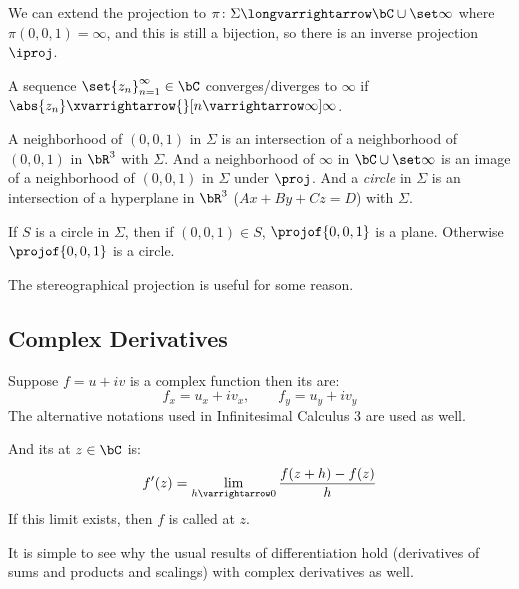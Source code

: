 \documentclass[10pt]{article}
\begin{document}
We can extend the projection to $\pi\colon\Sigma\longvarrightarrow\bC\cup\set\infty$ where $\pi(0,0,1)=\infty$, and this is still a bijection, so there is an inverse projection $\iproj$.

\newpage
\begin{defn*}

    A sequence $\set{z_n}_{n=1}^\infty\in\bC$ converges/diverges to $\infty$ if $\abs{z_n}\xvarrightarrow{}[n\varrightarrow\infty]\infty$.

\end{defn*}

A neighborhood of $(0,0,1)$ in $\Sigma$ is an intersection of a neighborhood of $(0,0,1)$ in $\bR^3$ with $\Sigma$.
And a neighborhood of $\infty$ in $\bC\cup\set\infty$ is an image of a neighborhood of $(0,0,1)$ in $\Sigma$ under $\proj$.
And a \emph{circle} in $\Sigma$ is an intersection of a hyperplane in $\bR^3$ ($Ax+By+Cz=D$) with $\Sigma$.

\begin{prop*}

    If $S$ is a circle in $\Sigma$, then if $(0,0,1)\in S$, $\projof{0,0,1}$ is a plane.
    Otherwise $\projof{0,0,1}$ is a circle.

\end{prop*}

The stereographical projection is useful for some reason.

\subsection{Complex Derivatives}

\begin{defn*}

    Suppose $f=u+iv$ is a complex function then its  are:
    \[ f_x = u_x + iv_x,\qquad f_y = u_y + iv_y \]
    The alternative notations used in Infinitesimal Calculus $3$ are used as well.

    And its  at $z\in\bC$ is:
    \[ f'(z) = \lim_{h\varrightarrow0}\frac{f(z+h)-f(z)}h \]
    If this limit exists, then $f$ is called  at $z$.

\end{defn*}

It is simple to see why the usual results of differentiation hold (derivatives of sums and products and scalings) with complex derivatives as well.
\end{document}
